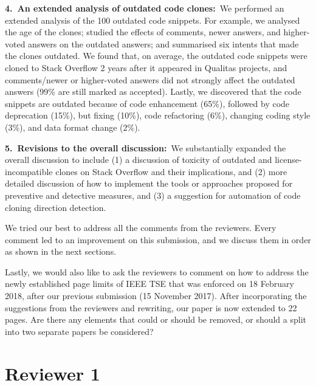\documentclass[a4paper,twoside,10pt]{reviewresponse}
\begin{document}
\textbf{4.~An extended analysis of outdated code clones:}~We performed an
extended analysis of the 100 outdated code snippets. For example, we analysed
the age of the clones; studied the effects of comments, newer answers, and higher-voted
answers on the outdated answers; and summarised six intents that made the
clones outdated. We found that, on average, the outdated code snippets were cloned to Stack Overflow
2 years after it appeared in Qualitas projects, and comments/newer or
higher-voted answers did not strongly affect the outdated answers (99\% are
still marked as accepted). Lastly, we discovered that the code snippets are outdated
because of code enhancement (65\%), followed by code deprecation (15\%), but
fixing (10\%), code refactoring (6\%), changing coding style (3\%), and data
format change (2\%).

\textbf{5.~Revisions to the overall discussion:}~We substantially expanded the
overall discussion to include (1) a discussion of toxicity of outdated and
license-incompatible clones on Stack Overflow and their implications, and (2)
more detailed discussion of how to implement the tools or approaches proposed
for preventive and detective measures, and (3) a suggestion for automation of
code cloning direction detection.

\clearpage
We tried our best to address all the comments from the reviewers. Every
comment led to an improvement on this submission, and we discuss them in order as
shown in the next sections.

Lastly, we would also like to ask the reviewers to comment on how to address the
newly established page limits of IEEE TSE that was enforced on 18 February 2018, after our previous
submission (15 November 2017). After incorporating the suggestions from the reviewers and
rewriting, our paper is now extended to 22 pages. Are there any elements that
could or should be removed, or should a split into two separate papers be
considered?

\clearpage

\section{Reviewer 1}
\end{document}
